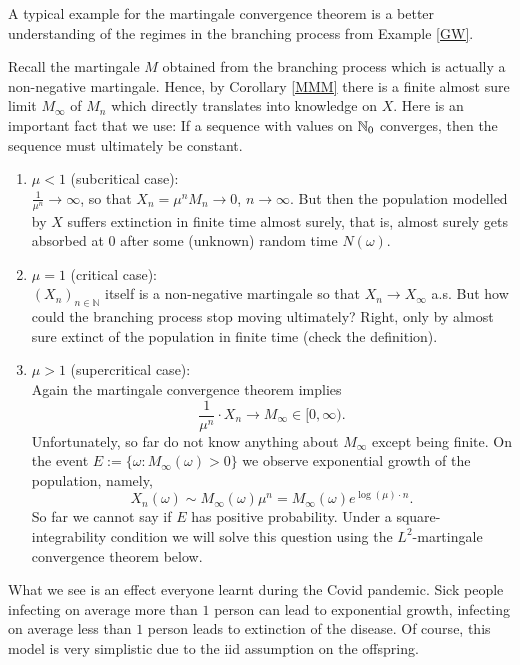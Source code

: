 A typical example for the martingale convergence theorem is a better understanding of the regimes in the branching process from Example \ref{GW}.
\begin{example}\label{branching1}
Recall the martingale $M$ obtained from the branching process which is actually a non-negative martingale. Hence, by Corollary \ref{MMM} there is a finite almost sure limit $M_{\infty}$ of $M_n$ which directly translates into knowledge on $X$. Here is an important fact that we use: If a sequence with values on $\mathbb{N}_0$ converges, then the sequence must ultimately be constant.
			\begin{enumerate}[label=(\roman*)]	
				\item 
				$\mu < 1$ (subcritical case): \\
					$\frac{1}{\mu^n} \to \infty$, so that $X_n = \mu^n M_n \to 0$, $n \to \infty$. But then the population modelled by $X$ suffers extinction in finite time almost surely, that is, almost surely gets absorbed at $0$ after some (unknown) random time $N(\omega)$.
				\item
					$\mu = 1$ (critical case): \\
					$(X_n)_{n\in\mathbb{N}}$ itself is a non-negative martingale so that $X_n \to X_{\infty}$ a.s. But how could the branching process stop moving ultimately? Right, only by almost sure extinct of the population in finite time (check the definition).
				\item
					$\mu > 1$ (supercritical case): \\
					Again the martingale convergence theorem implies
					$$\frac{1}{\mu^n}\cdot X_n \to M_{\infty}\in [0,\infty).$$
					Unfortunately, so far do not know anything about $M_\infty$ except being finite. On the event $E:=\lbrace\omega: M_{\infty}(\omega)> 0 \rbrace$ we observe exponential growth of the population, namely, $$X_n(\omega) \sim M_\infty(\omega) \mu^n = M_\infty (\omega) e^{\log(\mu)\cdot n}.$$ So far we cannot say if $E$ has positive probability. Under a square-integrability condition we will solve this question using the $L^2$-martingale convergence theorem below.
			\end{enumerate}
			What we see is an effect everyone learnt during the Covid pandemic. Sick people infecting on average more than $1$ person can lead to exponential growth, infecting on average less than $1$ person leads to extinction of the disease. Of course, this model is very simplistic due to the iid assumption on the offspring.
			
\end{example}
	\marginpar{\textcolor{red}{Lecture 7}}

